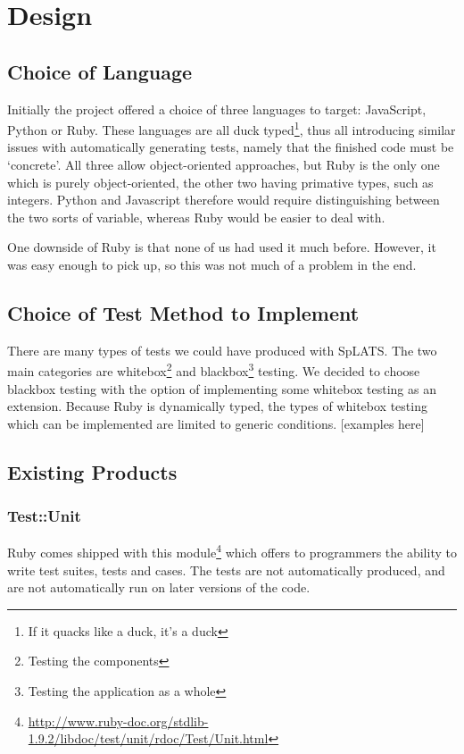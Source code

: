 \chapter{Design}

\section{Choice of Language}
  Initially the project offered a choice of three languages to target: JavaScript, Python or Ruby.
  These languages are all duck typed\footnote{If it quacks like a duck, it's a duck}, thus all introducing similar issues with automatically generating tests, namely that the finished code must be `concrete'.
  All three allow object-oriented approaches, but Ruby is the only one which is purely object-oriented, the other two having primative types, such as integers.
  Python and Javascript therefore would require distinguishing between the two sorts of variable, whereas Ruby would be easier to deal with.

  One downside of Ruby is that none of us had used it much before.
  However, it was easy enough to pick up, so this was not much of a problem in the end.

\section{Choice of Test Method to Implement}
  There are many types of tests we could have produced with SpLATS.
  The two main categories are whitebox\footnote{Testing the components} and blackbox\footnote{Testing the application as a whole} testing.
  We decided to choose blackbox testing with the option of implementing some whitebox testing as an extension.
  Because Ruby is dynamically typed, the types of whitebox testing which can be implemented are limited to generic conditions.
  [examples here]

\section{Existing Products}

  \subsection{Test::Unit}
    Ruby comes shipped with this module\footnote{\url{http://www.ruby-doc.org/stdlib-1.9.2/libdoc/test/unit/rdoc/Test/Unit.html}} which offers to programmers the ability to write test suites, tests and cases.
    The tests are not automatically produced, and are not automatically run on later versions of the code.

